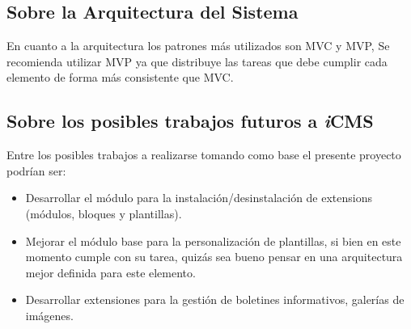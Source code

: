 \subsection{Sobre la Arquitectura del Sistema}
En cuanto a la arquitectura los patrones m\'as utilizados son MVC y MVP, Se recomienda utilizar MVP ya que distribuye las tareas que debe cumplir cada elemento de forma m\'as consistente que MVC.

\subsection{Sobre los posibles trabajos futuros a \textit{i}CMS}
Entre los posibles trabajos a realizarse tomando como base el presente proyecto podr\'ian ser:
\begin{itemize}
\item Desarrollar el m\'odulo para la instalaci\'on/desinstalaci\'on de extensions (m\'odulos, bloques y plantillas).
\item Mejorar el m\'odulo base para la personalizaci\'on de plantillas, si bien en este momento cumple con su tarea, quiz\'as sea bueno pensar en una arquitectura mejor definida para este elemento.
\item Desarrollar extensiones para la gesti\'on de boletines informativos, galer\'ias de im\'agenes.
\end{itemize}

\clearpage
